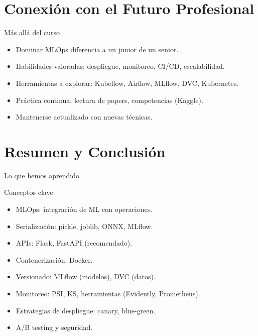 \documentclass[aspectratio=169, 10pt, xcolor=table]{beamer}
\begin{document}
\section{Conexión con el Futuro Profesional}

\begin{frame}{Más allá del curso}
    \begin{itemize}
        \item Dominar MLOps diferencia a un junior de un senior.
        \item Habilidades valoradas: despliegue, monitoreo, CI/CD, escalabilidad.
        \item Herramientas a explorar: Kubeflow, Airflow, MLflow, DVC, Kubernetes.
        \item Práctica continua, lectura de papers, competencias (Kaggle).
        \item Mantenerse actualizado con nuevas técnicas.
    \end{itemize}
\end{frame}

\section{Resumen y Conclusión}

\begin{frame}{Lo que hemos aprendido}
    \begin{exampleblock}{Conceptos clave}
        \begin{itemize}
            \item MLOps: integración de ML con operaciones.
            \item Serialización: pickle, joblib, ONNX, MLflow.
            \item APIs: Flask, FastAPI (recomendado).
            \item Contenerización: Docker.
            \item Versionado: MLflow (modelos), DVC (datos).
            \item Monitoreo: PSI, KS, herramientas (Evidently, Prometheus).
            \item Estrategias de despliegue: canary, blue-green.
            \item A/B testing y seguridad.
        \end{itemize}
    \end{exampleblock}
\end{frame}
\end{document}
